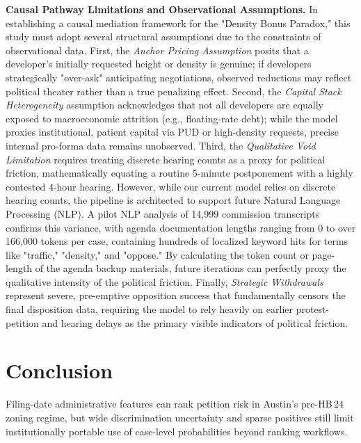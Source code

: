 \documentclass[11pt, letterpaper]{article}
\begin{document}
\textbf{Causal Pathway Limitations and Observational Assumptions.} In establishing a causal mediation framework for the "Density Bonus Paradox," this study must adopt several structural assumptions due to the constraints of observational data. First, the \textit{Anchor Pricing Assumption} posits that a developer's initially requested height or density is genuine; if developers strategically "over-ask" anticipating negotiations, observed reductions may reflect political theater rather than a true penalizing effect. Second, the \textit{Capital Stack Heterogeneity} assumption acknowledges that not all developers are equally exposed to macroeconomic attrition (e.g., floating-rate debt); while the model proxies institutional, patient capital via PUD or high-density requests, precise internal pro-forma data remains unobserved. Third, the \textit{Qualitative Void Limitation} requires treating discrete hearing counts as a proxy for political friction, mathematically equating a routine 5-minute postponement with a highly contested 4-hour hearing. However, while our current model relies on discrete hearing counts, the pipeline is architected to support future Natural Language Processing (NLP). A pilot NLP analysis of 14,999 commission transcripts confirms this variance, with agenda documentation lengths ranging from 0 to over 166,000 tokens per case, containing hundreds of localized keyword hits for terms like "traffic," "density," and "oppose." By calculating the token count or page-length of the agenda backup materials, future iterations can perfectly proxy the qualitative intensity of the political friction. Finally, \textit{Strategic Withdrawals} represent severe, pre-emptive opposition success that fundamentally censors the final disposition data, requiring the model to rely heavily on earlier protest-petition and hearing delays as the primary visible indicators of political friction.

\section{Conclusion}

Filing-date administrative features can rank petition risk in Austin's pre-HB\,24 zoning regime, but wide discrimination uncertainty and sparse positives still limit institutionally portable use of case-level probabilities beyond ranking workflows.
\end{document}
